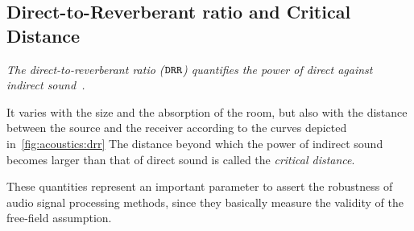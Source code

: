 \subsection{Direct-to-Reverberant ratio and Critical Distance}\label{ch:acoustics:subsec:drr}
\begin{center}
    \textit{The \emph{direct-to-reverberant ratio} ($\mathtt{DRR}$) quantifies the power of direct against indirect sound~\cite{zahorik2002direct}.}
\end{center}
It varies with the size and the absorption of the room, but also with the distance between the source and the receiver according to the curves
depicted in~\cref{fig:acoustics:drr}
The distance beyond which the power of indirect sound becomes larger than that of direct sound is called the \textit{critical distance}.

These quantities represent an important parameter to assert the robustness of audio signal processing methods,
since they basically measure the validity of the free-field assumption.

